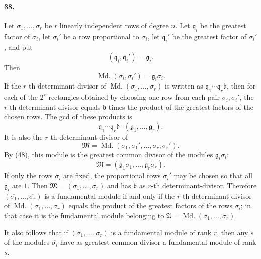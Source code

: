 \documentclass[11pt]{article}
\newcommand{\Md}{\operatorname{Md.}}
\begin{document}
\paragraph{38.}
Let $\sigma_1,
\ldots,
\sigma_r$ be $r$ linearly independent rows of degree $n$. Let $\mathfrak q_i$ be the greatest factor of $\sigma_i$, let $\sigma_i'$ be a row proportional to $\sigma_i$, let $\mathfrak q_i'$ be the greatest factor of $\sigma_i'$, and put
\begin{equation}
(\mathfrak q_i,\mathfrak q_i')=\mathfrak g_i.
\tag{47}
\end{equation}
Then
\begin{equation}
\Md(\sigma_i,\sigma_i')=\mathfrak g_i\overline{\sigma_i}.
\tag{48}
\end{equation}
If the $r$-th determinant-divisor of $\Md(\sigma_1,
\ldots,
\sigma_r)$ is written as $\mathfrak q_1\cdots\mathfrak q_r\mathfrak b$, then for each of the $2^r$ rectangles obtained by choosing one row from each pair $\sigma_i,
\sigma_i'$, the $r$-th determinant-divisor equals $\mathfrak b$ times the product of the greatest factors of the chosen rows. The gcd of these products is
\begin{equation}
\mathfrak q_1\cdots\mathfrak q_r\mathfrak b\cdot(\mathfrak g_1,
\ldots,
\mathfrak g_r).
\tag{49}
\end{equation}
It is also the $r$-th determinant-divisor of
\begin{equation}
\mathfrak M=\Md(\sigma_1,
\sigma_1',
\ldots,
\sigma_r,
\sigma_r').
\tag{49'}
\end{equation}
By (48), this module is the greatest common divisor of the modules $\mathfrak g_i\overline{\sigma_i}$:
\begin{equation}
\mathfrak M=(\mathfrak g_1\overline{\sigma_1},
\ldots,
\mathfrak g_r\overline{\sigma_r}).
\tag{50}
\end{equation}
If only the rows $\sigma_i$ are fixed, the proportional rows $\sigma_i'$ may be chosen so that all $\mathfrak g_i$ are $1$. Then $\mathfrak M=(\overline{\sigma_1},
\ldots,
\overline{\sigma_r})$ and has $\mathfrak b$ as $r$-th determinant-divisor. Therefore $(\overline{\sigma_1},
\ldots,
\overline{\sigma_r})$ is a fundamental module if and only if the $r$-th determinant-divisor of $\Md(\sigma_1,
\ldots,
\sigma_r)$ equals the product of the greatest factors of the rows $\sigma_i$; in that case it is the fundamental module belonging to $\mathfrak A=\Md(\sigma_1,
\ldots,
\sigma_r)$.

It also follows that if $(\overline{\sigma_1},
\ldots,
\overline{\sigma_r})$ is a fundamental module of rank $r$, then any $s$ of the modules $\overline{\sigma_i}$ have as greatest common divisor a fundamental module of rank $s$.
\end{document}
